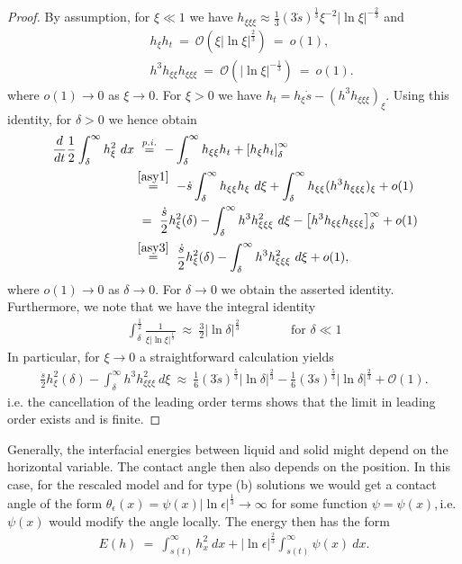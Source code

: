 \documentclass[pagesize,pdftex]{amsart}
\renewcommand{\d}{\delta}
\newcommand{\OO}{{\mathcal O}}
\newcommand{\eps}{\epsilon}
\newcommand{\ang}{\theta}
\newcommand{\ddt}{\, \frac{d}{dt}}
\newcommand{\upref}[2]{\hspace{-0.8ex}\stackrel{\eqref{#1}}{#2}} %
\begin{document}
\begin{proof}
  By assumption, for $\xi \ll 1$ we have
  $h_{\xi\xi\xi} \approx \frac 13 (3 \dot s)^{\frac 13} \xi^{-2} |\ln \xi|^{-\frac 23}$ and
  \begin{align}  %
    &h_\xi h_t  \ %
    = \ \OO(\xi |\ln \xi |^{\frac23}) \ = \ o(1), \label{asy1} \\ \qquad %
    &h^3h_{\xi\xi}h_{\xi\xi\xi} \ %
    = \ \OO(|\ln \xi |^{-\frac 13}) \ = \ o(1). \label{asy3} %
  \end{align}
  where $o(1) \to 0$ as $\xi \to 0$.  For $\xi > 0$ we have
  $h_t = h_\xi\dot s - (h^3 h_{\xi\xi\xi})_\xi$. Using this identity, for
  $\d > 0$ we hence obtain
  \begin{align}
    \ddt \frac 12 \int_{\d}^{\infty } h_\xi ^2\ dx  \ %
    &\stackrel{p.i.}= \ -\int_{\d}^{\infty }h_{\xi\xi}h_t + \left[ h_{\xi
      }h_t \right]_{\d}^{\infty } \notag \\
    &\upref{asy1}= \ -\dot s\int_{\d}^{\infty } h_{\xi\xi} h_\xi  \ d\xi %
      + \int_{\d}^{\infty }h_{\xi\xi}(h^3h_{\xi\xi \xi})_\xi +  o(1) \notag \\
    &= \ \frac{\dot s}2h_\xi ^2(\d )-\int_{\d}^{\infty} h^3h_{\xi\xi \xi}^2 \ d\xi %
      -\left[ h^3h_{\xi\xi}h_{\xi\xi \xi}  \right]_{\d}^{\infty }+ o(1) \notag \\
    &\upref{asy3}= \ \frac{\dot s}2h_\xi ^2(\d) - \int_{\d}^{\infty}h^3h_{\xi\xi \xi}^2 \ d\xi  + o(1),  \notag
  \end{align}%
  where $o(1) \to 0$ as $\d \to 0$. For $\d \to 0$ we obtain the asserted
  identity. Furthermore, we note that we have  the integral identity
  \begin{align}
    \int_\d^{\frac 12} \frac 1{\xi |\ln \xi|^{\frac 13}} \ %
    \approx \ \frac 32 |\ln \d|^{\frac 23}  \qquad\qquad \text{for $\d \ll 1$}
  \end{align}
  In particular, for  $\xi \to 0$ a straightforward calculation yields
  \begin{align}
    \frac{\dot s}2h_\xi ^2(\d) - \int_{\d}^{\infty}h^3h_{\xi\xi \xi}^2 \ d\xi \ %
    \approx \ \frac 16  (3\dot s)^{\frac 53} |\ln \d|^{\frac 23}  -  \frac 16 (3 \dot s)^{\frac 53} |\ln \d|^{\frac 23} + \OO(1).
  \end{align}
  i.e. the cancellation of the leading order terms shows that the limit in
  leading order exists and is finite.
\end{proof}
Generally, the interfacial energies between liquid and solid might depend on the
horizontal variable. The contact angle then also depends on the position.  In
this case, for the rescaled model and for type (b) solutions we would get a
contact angle of the form
$\ang_{\eps}(x) = \psi (x) |\ln \eps|^{\frac 13}\to \infty$ for some function
$\psi = \psi (x)$,$\,$i.e. $\psi (x)$ would modify the angle locally. The energy
then has the form
\begin{align}
  E(h) \ %
  = \ \int_{s(t)}^{\infty }h_x^2 \ dx +|\ln \eps|^{\frac23} \int_{s(t)}^{\infty }\psi (x)\ dx.
\end{align}
\end{document}
